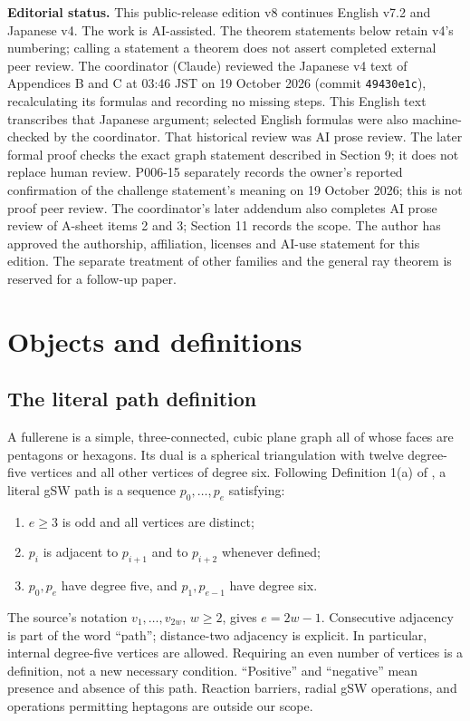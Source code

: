 \documentclass[11pt]{amsart}
\newcommand{\record}[1]{\nolinkurl{#1}}
\begin{document}
\noindent\textbf{Editorial status.} This public-release edition v8 continues English v7.2 and Japanese v4. The work is AI-assisted. The theorem statements below
retain v4's numbering; calling a statement a theorem does not assert
completed external peer review. The coordinator (Claude) reviewed the
Japanese v4 text of Appendices B and C at 03:46 JST on 19 October 2026
(commit \record{49430e1c}), recalculating its formulas and recording no
missing steps. This English text transcribes that Japanese argument;
selected English formulas were also machine-checked by the coordinator.
That historical review was AI prose review. The later formal proof
checks the exact graph statement described in Section 9; it does not
replace human review. P006-15 separately records the owner's
reported confirmation of the challenge statement's meaning on
19 October 2026; this is not proof peer review.
The coordinator's later addendum also completes AI prose review of A-sheet items 2 and 3; Section 11 records the scope. The author has approved the authorship, affiliation, licenses and AI-use statement for this edition. The separate treatment of other
families and the general ray theorem is reserved for a follow-up paper.

\section{Objects and definitions}\label{sec:definitions}
\subsection{The literal path definition}
A fullerene is a simple, three-connected, cubic plane graph all of whose
faces are pentagons or hexagons. Its dual is a spherical triangulation
with twelve degree-five vertices and all other vertices of degree six.
Following Definition 1(a) of \cite{BBS}, a literal gSW path is a sequence
$p_0,\ldots,p_e$ satisfying:
\begin{enumerate}
\item $e\ge3$ is odd and all vertices are distinct;
\item $p_i$ is adjacent to $p_{i+1}$ and to $p_{i+2}$ whenever defined;
\item $p_0,p_e$ have degree five, and $p_1,p_{e-1}$ have degree six.
\end{enumerate}
The source's notation $v_1,\ldots,v_{2w}$, $w\ge2$, gives $e=2w-1$.
Consecutive adjacency is part of the word ``path''; distance-two
adjacency is explicit. In particular, internal degree-five vertices
are allowed. Requiring an even number of vertices is a definition, not
a new necessary condition. ``Positive'' and ``negative'' mean presence
and absence of this path. Reaction barriers, radial gSW operations,
and operations permitting heptagons are outside our scope.
\end{document}
